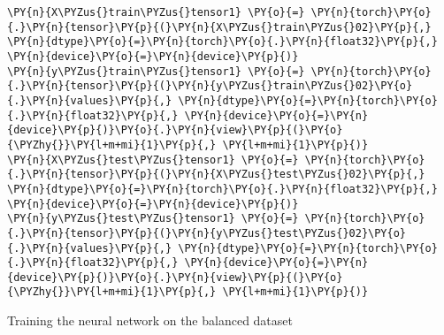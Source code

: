     \begin{tcolorbox}[breakable, size=fbox, boxrule=1pt, pad at break*=1mm,colback=cellbackground, colframe=cellborder]
\begin{Verbatim}[commandchars=\\\{\}]
\PY{n}{X\PYZus{}train\PYZus{}tensor1} \PY{o}{=} \PY{n}{torch}\PY{o}{.}\PY{n}{tensor}\PY{p}{(}\PY{n}{X\PYZus{}train\PYZus{}02}\PY{p}{,} \PY{n}{dtype}\PY{o}{=}\PY{n}{torch}\PY{o}{.}\PY{n}{float32}\PY{p}{,} \PY{n}{device}\PY{o}{=}\PY{n}{device}\PY{p}{)}
\PY{n}{y\PYZus{}train\PYZus{}tensor1} \PY{o}{=} \PY{n}{torch}\PY{o}{.}\PY{n}{tensor}\PY{p}{(}\PY{n}{y\PYZus{}train\PYZus{}02}\PY{o}{.}\PY{n}{values}\PY{p}{,} \PY{n}{dtype}\PY{o}{=}\PY{n}{torch}\PY{o}{.}\PY{n}{float32}\PY{p}{,} \PY{n}{device}\PY{o}{=}\PY{n}{device}\PY{p}{)}\PY{o}{.}\PY{n}{view}\PY{p}{(}\PY{o}{\PYZhy{}}\PY{l+m+mi}{1}\PY{p}{,} \PY{l+m+mi}{1}\PY{p}{)}
\PY{n}{X\PYZus{}test\PYZus{}tensor1} \PY{o}{=} \PY{n}{torch}\PY{o}{.}\PY{n}{tensor}\PY{p}{(}\PY{n}{X\PYZus{}test\PYZus{}02}\PY{p}{,} \PY{n}{dtype}\PY{o}{=}\PY{n}{torch}\PY{o}{.}\PY{n}{float32}\PY{p}{,} \PY{n}{device}\PY{o}{=}\PY{n}{device}\PY{p}{)}
\PY{n}{y\PYZus{}test\PYZus{}tensor1} \PY{o}{=} \PY{n}{torch}\PY{o}{.}\PY{n}{tensor}\PY{p}{(}\PY{n}{y\PYZus{}test\PYZus{}02}\PY{o}{.}\PY{n}{values}\PY{p}{,} \PY{n}{dtype}\PY{o}{=}\PY{n}{torch}\PY{o}{.}\PY{n}{float32}\PY{p}{,} \PY{n}{device}\PY{o}{=}\PY{n}{device}\PY{p}{)}\PY{o}{.}\PY{n}{view}\PY{p}{(}\PY{o}{\PYZhy{}}\PY{l+m+mi}{1}\PY{p}{,} \PY{l+m+mi}{1}\PY{p}{)}
\end{Verbatim}
\end{tcolorbox}

    Training the neural network on the balanced dataset

